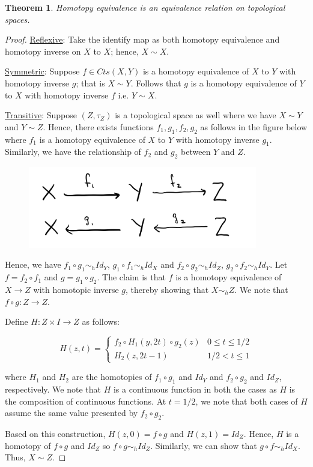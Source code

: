 \documentclass{article}
\newtheorem{theorem}{Theorem}[section]
\theoremstyle{definition}
\newcommand{\topspace}[1]{$(#1, \tau_{#1})$}
\begin{document}
\begin{theorem}
Homotopy equivalence is an equivalence relation on topological spaces.
\end{theorem}
\begin{proof}
\underline{Reflexive}:
Take the identify map as both homotopy equivalence and homotopy inverse on $X$ to $X$; hence, $X \sim X$.

\underline{Symmetric}:
Suppose $f \in Cts(X,Y)$ is a homotopy equivalence of $X$ to $Y$ with homotopy inverse $g$; that is $X \sim Y$. Follows that $g$ is a homotopy equivalence of $Y$ to $X$ with homotopy inverse $f$ i.e. $Y \sim X$.

\underline{Transitive}:
Suppose \topspace{Z} is a topological space as well where we have $X \sim Y$ and $Y \sim Z$. Hence, there exists functions $f_{1}, g_{1}, f_{2}, g_{2}$ as follows in the figure below where $f_{1}$ is a homotopy equivalence of $X$ to $Y$ with homotopy inverse $g_{1}$. Similarly, we have the relationship of $f_{2}$ and $g_{2}$ between $Y$ and $Z$.

\begin{figure}[H]
\centering
\includegraphics[width=10cm]{images/m2_homotopyequivalent_transitivity.png}
\end{figure}

Hence, we have $f_{1} \circ g_{1} \sim_{h} Id_{Y}$, $g_{1} \circ f_{1} \sim_{h} Id_{X}$ and $f_{2} \circ g_{2} \sim_{h} Id_{Z}$, $g_{2} \circ f_{2} \sim_{h} Id_{Y}$. Let $f = f_{2} \circ f_{1}$ and $g = g_{1} \circ g_{2}$. The claim is that $f$ is a homotopy equivalence of $X \to Z$ with homotopic inverse $g$, thereby showing that $X \sim_{h} Z$. We note that $f \circ g: Z \to Z$.

Define $H: Z \times I \to Z$ as follows:

\begin{equation*}
    H(z,t) =
    \begin{cases}
    f_{2} \circ H_{1}(y,2t) \circ g_{2}(z) & 0 \leq t \leq 1/2\\
    H_{2}(z,2t-1) & 1/2 < t \leq 1
    \end{cases}
\end{equation*}

where $H_{1}$ and $H_{2}$ are the homotopies of $f_{1} \circ g_{1}$ and $Id_{Y}$ and $f_{2} \circ g_{2}$ and $Id_{Z}$, respectively. We note that $H$ is a continuous function in both the cases as $H$ is the composition of continuous functions. At $t=1/2$, we note that both cases of $H$ assume the same value presented by $f_{2} \circ g_{2}$.

Based on this construction, $H(z,0) = f \circ g$ and $H(z,1) = Id_{Z}$. Hence, $H$ is a homotopy of $f \circ g$ and $Id_{Z}$ so $f \circ g \sim_{h} Id_{Z}$. Similarly, we can show that $g \circ f \sim_{h} Id_{X}$. Thus, $X \sim Z$.
\end{proof}
\end{document}
